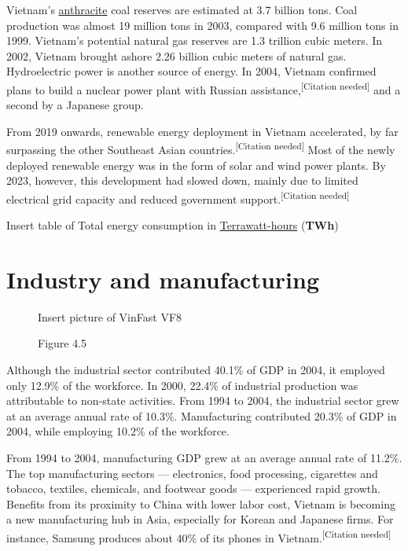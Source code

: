 \documentclass[openany]{book}
\begin{document}
Vietnam's \href{https://en.wikipedia.org/wiki/Anthracite}{anthracite} coal reserves are estimated at 3.7 billion tons. Coal production was almost 19 million tons in 2003, compared with 9.6 million tons in 1999. Vietnam's potential natural gas reserves are 1.3 trillion cubic meters. In 2002, Vietnam brought ashore 2.26 billion cubic meters of natural gas. Hydroelectric power is another source of energy. In 2004, Vietnam confirmed plans to build a nuclear power plant with Russian assistance,\textsuperscript{[Citation needed]} and a second by a Japanese group.

From 2019 onwards, renewable energy deployment in Vietnam accelerated, by far surpassing the other Southeast Asian countries.\textsuperscript{[Citation needed]} Most of the newly deployed renewable energy was in the form of solar and wind power plants. By 2023, however, this development had slowed down, mainly due to limited electrical grid capacity and reduced government support.\textsuperscript{[Citation needed]}
\clearpage
\begin{table}
Insert table of Total energy consumption in \href{https://en.wikipedia.org/wiki/Terrawatt-hour}{Terrawatt-hours} (\textbf{TWh})
\caption*{Table 4.1}
\end{table}

\section{Industry and manufacturing}

\begin{figure}
    \begin{framed}
    Insert picture of VinFast VF8
    \caption*{\href{https://en.wikipedia.org/wiki/VinFast}{VinFast}, Vietnam's first global automaker has its manufacturing facility in \href{https://en.wikipedia.org/wiki/Haiphong}{Hải Phòng}.}
    \caption*{Figure 4.5}
    \end{framed}
\end{figure}

Although the industrial sector contributed 40.1\% of GDP in 2004, it employed only 12.9\% of the workforce. In 2000, 22.4\% of industrial production was attributable to non-state activities. From 1994 to 2004, the industrial sector grew at an average annual rate of 10.3\%. Manufacturing contributed 20.3\% of GDP in 2004, while employing 10.2\% of the workforce.

From 1994 to 2004, manufacturing GDP grew at an average annual rate of 11.2\%. The top manufacturing sectors — electronics, food processing, cigarettes and tobacco, textiles, chemicals, and footwear goods — experienced rapid growth. Benefits from its proximity to China with lower labor cost, Vietnam is becoming a new manufacturing hub in Asia, especially for Korean and Japanese firms. For instance, Samsung produces about 40\% of its phones in Vietnam.\textsuperscript{[Citation needed]}
\end{document}
